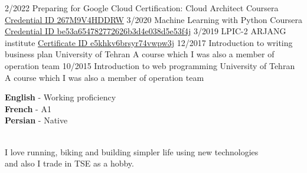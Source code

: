 \documentclass[9pt]{developercv}
\begin{document}

\begin{entrylist}
	\entry
	{2/2022}
	{Preparing for Google Cloud Certification: Cloud Architect}
	{Coursera}
	{{\href{https://www.coursera.org/account/accomplishments/professional-cert/267M9V4HDDRW}{Credential ID 267M9V4HDDRW}}
	}
	\entry
	{3/2020}
	{Machine Learning with Python}
	{Coursera}
	{{\href{https://www.coursera.org/account/accomplishments/records/8KNW27XHXTVF?utm_medium=Certificate}{Credential ID be53a654782772626b3d4e038d5e53f4j}}}
	\entry
	{3/2019}
	{LPIC-2}
	{ARJANG institute}
	{{\href{http://gotoclass.ir/Certificates/e5khkv6brsyr74vwpw3j/}{Certificate ID e5khkv6brsyr74vwpw3j}}}
	\entry
	{12/2017}
	{Introduction to writing business plan}
	{University of Tehran}
	{A course which I was also a member of operation team}
	\entry
	{10/2015}
	{Introduction to web programming}
	{University of Tehran}
	{A course which I was also a member of operation team}

\end{entrylist}


\begin{minipage}[t]{0.45\textwidth}
	\vspace{-\baselineskip} %


	\textbf{English} - Working proficiency\\
	\textbf{French} - A1\\
	\textbf{Persian} - Native\\\
\end{minipage}
\hfill
\begin{minipage}[t]{0.45\textwidth}
	\vspace{-\baselineskip} %


	I love running, biking and building simpler life using new technologies\\
	and also I trade in TSE as a hobby.
\end{minipage}
\end{document}
